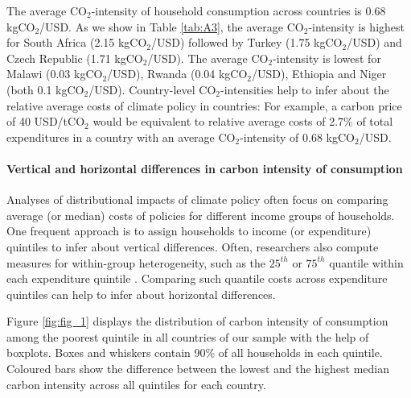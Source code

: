 \documentclass[12pt, a4paper]{article}
\begin{document}

The average CO$_{2}$-intensity of household consumption across countries is 0.68 kgCO$_{2}$/USD. As we show in Table \ref{tab:A3}, the average CO$_{2}$-intensity is highest for South Africa (2.15 kgCO$_{2}$/USD) followed by Turkey (1.75 kgCO$_{2}$/USD) and Czech Republic (1.71 kgCO$_{2}$/USD). The average CO$_{2}$-intensity is lowest for Malawi (0.03 kgCO$_{2}$/USD), Rwanda (0.04 kgCO$_{2}$/USD), Ethiopia and Niger (both 0.1 kgCO$_{2}$/USD). Country-level CO$_{2}$-intensities help to infer about the relative average costs of climate policy in countries: For example, a carbon price of 40 USD/tCO$_{2}$ \autocite{Stiglitz.2017b} would be equivalent to relative average costs of 2.7\% of total expenditures in a country with an average CO$_{2}$-intensity of 0.68 kgCO$_{2}$/USD.


\paragraph{Vertical and horizontal differences in carbon intensity of consumption}

Analyses of distributional impacts of climate policy often focus on comparing average (or median) costs of policies for different income groups of households. One frequent approach is to assign households to income (or expenditure) quintiles to infer about vertical differences. Often, researchers also compute measures for within-group heterogeneity, such as the $25^{th}$ or $75^{th}$ quantile within each expenditure quintile \autocite{Cronin.2019, Missbach.2024}. Comparing such quantile costs across expenditure quintiles can help to infer about horizontal differences.

Figure \ref{fig:fig_1} displays the distribution of carbon intensity of consumption among the poorest quintile in all countries of our sample with the help of boxplots. Boxes and whiskers contain 90\% of all households in each quintile. Coloured bars show the difference between the lowest and the highest median carbon intensity across all quintiles for each country.
\end{document}
